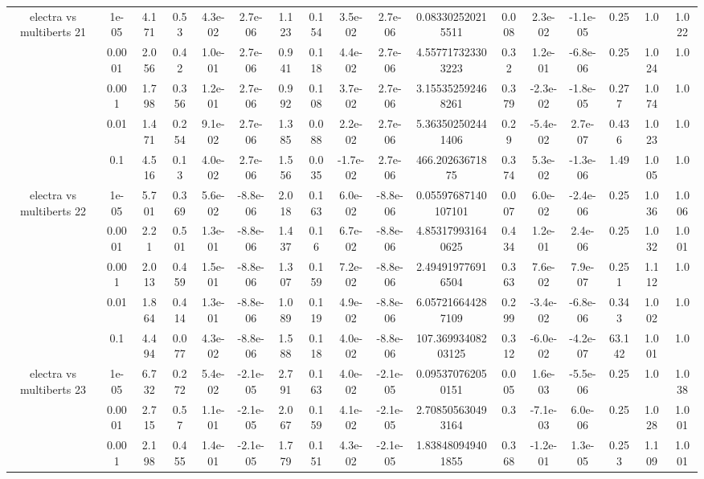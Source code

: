 \begin{tabular}{|c|c|c|c|c|c|c|c|c|c|c|c|c|c|c|c|c|}
\hline
\multirow{5}{*}{electra  vs multiberts 21} & 1e-05 & 4.171 & 0.53 & 4.3e-02 & 2.7e-06 & 1.123 & 0.154 & 3.5e-02 & 2.7e-06 & 0.083302520215511 & 0.008 & 2.3e-02 & -1.1e-05 & 0.25 & 1.0 & 1.022 \\
 & 0.0001 & 2.056 & 0.42 & 1.0e-01 & 2.7e-06 & 0.941 & 0.118 & 4.4e-02 & 2.7e-06 & 4.557717323303223 & 0.32 & 1.2e-01 & -6.8e-06 & 0.25 & 1.024 & 1.0 \\
 & 0.001 & 1.798 & 0.356 & 1.2e-01 & 2.7e-06 & 0.992 & 0.108 & 3.7e-02 & 2.7e-06 & 3.155352592468261 & 0.379 & -2.3e-02 & -1.8e-05 & 0.277 & 1.074 & 1.0 \\
 & 0.01 & 1.471 & 0.254 & 9.1e-02 & 2.7e-06 & 1.385 & 0.088 & 2.2e-02 & 2.7e-06 & 5.363502502441406 & 0.29 & -5.4e-02 & 2.7e-07 & 0.436 & 1.023 & 1.0 \\
 & 0.1 & 4.516 & 0.13 & 4.0e-02 & 2.7e-06 & 1.556 & 0.035 & -1.7e-02 & 2.7e-06 & 466.20263671875 & 0.374 & 5.3e-02 & -1.3e-06 & 1.49 & 1.005 & 1.0 \\
\hline
\multirow{5}{*}{electra  vs multiberts 22} & 1e-05 & 5.701 & 0.369 & 5.6e-02 & -8.8e-06 & 2.018 & 0.163 & 6.0e-02 & -8.8e-06 & 0.05597687140107101 & 0.007 & 6.0e-02 & -2.4e-06 & 0.25 & 1.036 & 1.006 \\
 & 0.0001 & 2.21 & 0.501 & 1.3e-01 & -8.8e-06 & 1.437 & 0.16 & 6.7e-02 & -8.8e-06 & 4.853179931640625 & 0.434 & 1.2e-01 & 2.4e-06 & 0.25 & 1.032 & 1.001 \\
 & 0.001 & 2.013 & 0.459 & 1.5e-01 & -8.8e-06 & 1.307 & 0.159 & 7.2e-02 & -8.8e-06 & 2.494919776916504 & 0.363 & 7.6e-02 & 7.9e-07 & 0.251 & 1.112 & 1.0 \\
 & 0.01 & 1.864 & 0.414 & 1.3e-01 & -8.8e-06 & 1.089 & 0.119 & 4.9e-02 & -8.8e-06 & 6.057216644287109 & 0.299 & -3.4e-02 & -6.8e-06 & 0.343 & 1.002 & 1.0 \\
 & 0.1 & 4.494 & 0.077 & 4.3e-02 & -8.8e-06 & 1.588 & 0.118 & 4.0e-02 & -8.8e-06 & 107.36993408203125 & 0.312 & -6.0e-02 & -4.2e-07 & 63.142 & 1.001 & 1.0 \\
\hline
\multirow{5}{*}{electra  vs multiberts 23} & 1e-05 & 6.732 & 0.272 & 5.4e-02 & -2.1e-05 & 2.791 & 0.163 & 4.0e-02 & -2.1e-05 & 0.095370762050151 & 0.005 & 1.6e-03 & -5.5e-06 & 0.25 & 1.0 & 1.038 \\
 & 0.0001 & 2.715 & 0.57 & 1.1e-01 & -2.1e-05 & 2.067 & 0.159 & 4.1e-02 & -2.1e-05 & 2.708505630493164 & 0.3 & -7.1e-03 & 6.0e-06 & 0.25 & 1.028 & 1.001 \\
 & 0.001 & 2.198 & 0.455 & 1.4e-01 & -2.1e-05 & 1.779 & 0.151 & 4.3e-02 & -2.1e-05 & 1.838480949401855 & 0.368 & -1.2e-01 & 1.3e-05 & 0.253 & 1.109 & 1.001 \\

\end{tabular}
